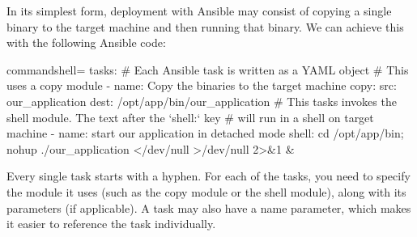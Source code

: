 

In its simplest form, deployment with Ansible may consist of copying a single binary to the target machine and then running that binary. We can achieve this with the following Ansible code:

\begin{tcblisting}{commandshell={}}
tasks:
  # Each Ansible task is written as a YAML object
  # This uses a copy module
  - name: Copy the binaries to the target machine
    copy:
      src: our_application
      dest: /opt/app/bin/our_application
  # This tasks invokes the shell module. The text after the `shell:` key
  # will run in a shell on target machine
  - name: start our application in detached mode
    shell: cd /opt/app/bin; nohup ./our_application </dev/null >/dev/null
2>&1 &
\end{tcblisting}

Every single task starts with a hyphen. For each of the tasks, you need to specify the module it uses (such as the copy module or the shell module), along with its parameters (if applicable). A task may also have a name parameter, which makes it easier to reference the task individually.

